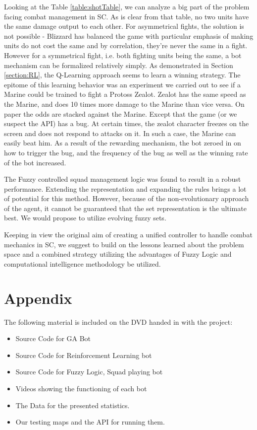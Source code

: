 \documentclass[conference]{IEEEtran}
\begin{document}
Looking at the Table \ref{table:shotTable}, we can analyze a big part of the problem facing combat management in SC. As is clear from that table, no two units have the same damage output to each other. For asymmetrical fights, the solution is not possible - Blizzard has balanced the game with particular emphasis of making units do not cost the same and by correlation, they're never the same in a fight. However for a symmetrical fight, i.e. both fighting units being the same, a bot mechanism can be formalized relatively simply. As demonstrated in Section \ref{section:RL}, the Q-Learning approach seems to learn a winning strategy. The epitome of this learning behavior was an experiment we carried out to see if a Marine could be trained to fight a Protoss Zealot.
 Zealot has the same speed as the Marine, and does 10 times more damage to the Marine than vice versa. On paper the odds are stacked against the Marine. Except that the game (or we suspect the API) has a bug. At certain times, the zealot character freezes on the screen and does not respond to attacks on it. In such a case, the Marine can easily beat him. As a result of the rewarding mechanism, the bot zeroed in on how to trigger the bug, and the frequency of the bug as well as the winning rate of the bot increased.

The Fuzzy controlled squad management logic was found to result in a robust performance. Extending the representation and expanding the rules brings a lot of potential for this method. However, because of the non-evolutionary approach of the agent, it cannot be guaranteed that the set representation is the ultimate best. We would propose to utilize evolving fuzzy sets.

Keeping in view the original aim of creating a unified controller to handle combat mechanics in SC, we suggest to build on the lessons learned about the problem space and a combined strategy utilizing the advantages of Fuzzy Logic and computational intelligence methodology be utilized.

\section*{Appendix}
The following material is included on the DVD handed in with the project:
\begin{itemize}
\item Source Code for GA Bot
\item Source Code for Reinforcement Learning bot
\item Source Code for Fuzzy Logic, Squad playing bot
\item Videos showing the functioning of each bot
\item The Data for the presented statistics.
\item Our testing maps and the API for running them.
\end{itemize}
\end{document}
